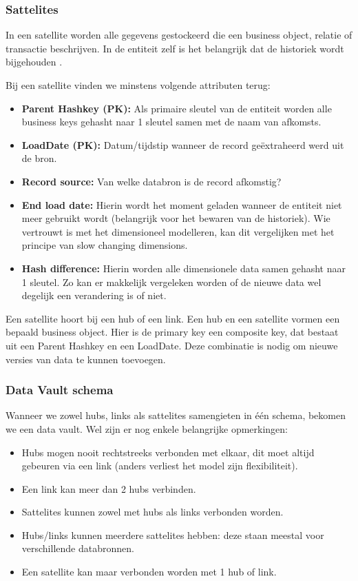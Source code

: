 \subsubsection{Sattelites}
In een satellite worden alle gegevens gestockeerd die een business object, relatie of transactie beschrijven. In de entiteit zelf is het belangrijk dat de historiek wordt bijgehouden \autocite{Linstedt2016}.

Bij een satellite vinden we minstens volgende attributen terug:

\begin{itemize}
	\item \textbf{Parent Hashkey (PK):} Als primaire sleutel van de entiteit worden alle business keys gehasht naar 1 sleutel samen met de naam van afkomsts.
	\item \textbf{LoadDate (PK):} Datum/tijdstip wanneer de record geëxtraheerd werd uit de bron.
	\item \textbf{Record source:} Van welke databron is de record afkomstig?
	\item \textbf{End load date:} Hierin wordt het moment geladen wanneer de entiteit niet meer gebruikt wordt (belangrijk voor het bewaren van de historiek). Wie vertrouwt is met het dimensioneel modelleren, kan dit vergelijken met het principe van slow changing dimensions.
	\item \textbf{Hash difference:} Hierin worden alle dimensionele data samen gehasht naar 1 sleutel. Zo kan er makkelijk vergeleken worden of de nieuwe data wel degelijk een verandering is of niet.
\end{itemize} 

Een satellite hoort bij een hub of een link. Een hub en een satellite vormen een bepaald business object. Hier is de primary key een composite key, dat bestaat uit een Parent Hashkey en een LoadDate. Deze combinatie is nodig om nieuwe versies van data te kunnen toevoegen.

\subsubsection{Data Vault schema}
Wanneer we zowel hubs, links als sattelites samengieten in één schema, bekomen we een data vault. Wel zijn er nog enkele belangrijke opmerkingen:

\begin{itemize}
	\item Hubs mogen nooit rechtstreeks verbonden met elkaar, dit moet altijd gebeuren via een link (anders verliest het model zijn flexibiliteit).
	\item Een link kan meer dan 2 hubs verbinden.
	\item Sattelites kunnen zowel met hubs als links verbonden worden.
	\item Hubs/links kunnen meerdere sattelites hebben: deze staan meestal voor verschillende databronnen.
	\item Een satellite kan maar verbonden worden met 1 hub of link. 
\end{itemize} 

